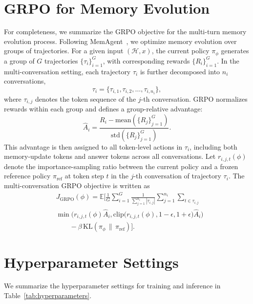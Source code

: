 
\section{GRPO for Memory Evolution}
\label{app:grpo}

For completeness, we summarize the GRPO objective for the multi-turn memory evolution process. Following MemAgent~\citep{yu2025memagent}, we optimize memory evolution over groups of trajectories. For a given input \((\mathcal{H}, x)\), the current policy \( \pi_\phi \) generates a group of \(G\) trajectories \(\{\tau_i\}_{i=1}^G\), with corresponding rewards \(\{R_i\}_{i=1}^G\). In the multi-conversation setting, each trajectory \(\tau_i\) is further decomposed into \(n_i\) conversations,
\[
\tau_i = \{\tau_{i,1}, \tau_{i,2}, \dots, \tau_{i,n_i}\},
\]
where \(\tau_{i,j}\) denotes the token sequence of the \(j\)-th conversation. GRPO normalizes rewards within each group and defines a group-relative advantage:
\begin{equation}
\widehat{A}_i
=
\frac{R_i - \mathrm{mean}(\{R_j\}_{j=1}^G)}{\mathrm{std}(\{R_j\}_{j=1}^G)}.
\end{equation}
This advantage is then assigned to all token-level actions in \(\tau_i\), including both memory-update tokens and answer tokens across all conversations. Let \(r_{i,j,t}(\phi)\) denote the importance-sampling ratio between the current policy and a frozen reference policy \(\pi_{\text{ref}}\) at token step \(t\) in the \(j\)-th conversation of trajectory \(\tau_i\). The multi-conversation GRPO objective is written as
\begin{equation}
\begin{aligned}
&J_{\mathrm{GRPO}}(\phi)
=
\mathbb{E}\Bigg[
\frac{1}{G}
\sum_{i=1}^G
\frac{1}{\sum_{j=1}^{n_i} |\tau_{i,j}|}
\sum_{j=1}^{n_i}
\sum_{t \in \tau_{i,j}}
\\[-2mm]
&\min\!\Big(
r_{i,j,t}(\phi)\widehat{A}_i,
\mathrm{clip}\!\big(r_{i,j,t}(\phi),1-\epsilon,1+\epsilon\big)\widehat{A}_i
\Big)
\\
&\qquad
-\beta\,\mathrm{KL}\!\left(\pi_\phi\,\|\,\pi_{\text{ref}}\right)
\Bigg].
\end{aligned}
\end{equation}

\section{Hyperparameter Settings} \label{app:hyperparameter}

We summarize the hyperparameter settings for training and inference in Table~\ref{tab:hyperparameters}.

